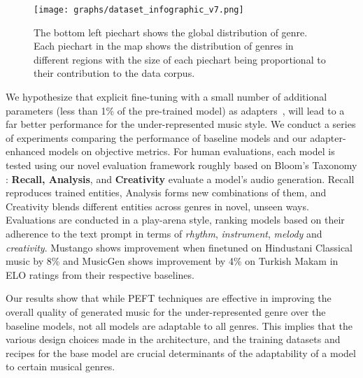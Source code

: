

\begin{figure*}[!ht]
\centering
\texttt{[image: graphs/dataset\_infographic\_v7.png]}
\caption{%
The bottom left piechart shows the global distribution of genre. Each piechart in the map shows the distribution of genres in different regions with the size of each piechart being proportional to their contribution to the data corpus.
}
\label{fig:dataset_infographic}
\end{figure*}

We hypothesize that explicit fine-tuning with a small number of additional parameters (less than 1\% of the pre-trained model) as adapters~\cite{bapna2019simple}, will lead to a far better performance for the under-represented music style. We conduct a series of experiments comparing the performance of baseline models and our adapter-enhanced models on objective metrics. For human evaluations, each model is tested using our novel evaluation framework roughly based on Bloom’s Taxonomy \cite{armstrong2010}: \textbf{Recall, Analysis}, and \textbf{Creativity} evaluate a model’s audio generation. Recall reproduces trained entities, Analysis forms new combinations of them, and Creativity blends different entities across genres in novel, unseen ways. Evaluations are conducted in a play-arena style, ranking models based on their adherence to the text prompt in terms of \textit{rhythm}, \textit{instrument}, \textit{melody} and \textit{creativity}. Mustango shows improvement when finetuned on Hindustani Classical music by 8\% and MusicGen shows improvement by 4\% on Turkish Makam in ELO ratings from their respective baselines. 

Our results show that while PEFT techniques are effective in improving the overall quality of generated music for the under-represented genre over the baseline models, not all models are adaptable to all genres. This implies that the various design choices made in the architecture, and the training datasets and recipes for the base model are crucial determinants of the adaptability of a model to certain musical genres. 


